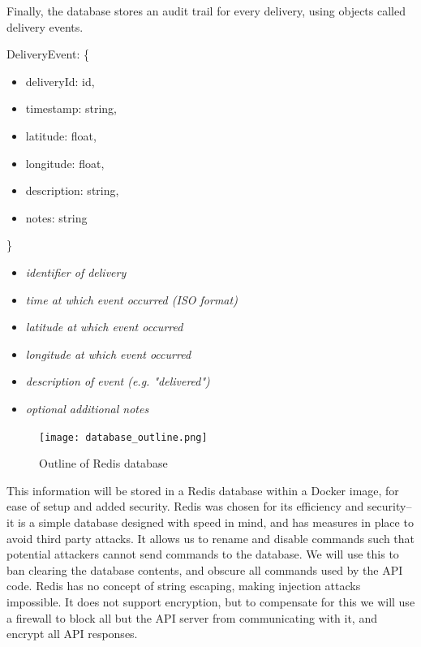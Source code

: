\begin{flushleft}
Finally, the database stores an audit trail for every delivery, using objects called delivery events.
\end{flushleft}
\begin{minipage}{6.5cm}
DeliveryEvent: \{
\begin{itemize}
    \itemsep-0.5em
    \item[] deliveryId: id,
    \item[] timestamp: string,
    \item[] latitude: float,
    \item[] longitude: float,
    \item[] description: string,
    \item[] notes: string
\end{itemize}
\}
\end{minipage}
\begin{minipage}{10cm}
\hspace{1cm}
\begin{itemize}
    \itemsep-0.5em
    \item[] \textit{identifier of delivery}
    \item[] \textit{time at which event occurred (ISO format)}
    \item[] \textit{latitude at which event occurred}
    \item[] \textit{longitude at which event occurred}
    \item[] \textit{description of event (e.g. "delivered")}
    \item[] \textit{optional additional notes}
\end{itemize}
\hspace{1cm}
\end{minipage}
\begin{figure}[h]
\texttt{[image: database\_outline.png]}
    \centering
    \caption{Outline of Redis database}
    \label{fig:redis_database}
\end{figure}
\begin{flushleft}
This information will be stored in a Redis database within a Docker image, for ease of setup and added security. Redis was chosen for its efficiency and security-- it is a simple database designed with speed in mind, and has measures in place to avoid third party attacks\cite{redisSecutiry}. It allows us to rename and disable commands such that potential attackers cannot send commands to the database. We will use this to ban clearing the database contents, and obscure all commands used by the API code. Redis has no concept of string escaping, making injection attacks impossible. It does not support encryption, but to compensate for this we will use a firewall to block all but the API server from communicating with it, and encrypt all API responses.
\end{flushleft}

